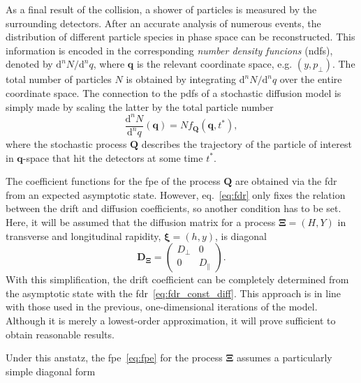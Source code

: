 \documentclass[a4paper,12pt]{book}
\begin{document}
As a final result of the collision, a shower of particles is measured by the surrounding detectors. After an accurate analysis of numerous events, the distribution of different particle species in phase space can be reconstructed. This information is encoded in the corresponding \textit{number density funcions} (\acrshort{ndf}s), denoted by $\mathrm{d}^nN/\mathrm{d}^n q$, where $\bm{q}$ is the relevant coordinate space, e.g. $(y,p_\perp)$. The total number of particles $N$ is obtained by integrating $\mathrm{d}^nN/\mathrm{d}^n q$ over the entire coordinate space. 
The connection to the \acrshort{pdf}s of a stochastic diffusion model is simply made by scaling the latter by the total particle number 
\begin{equation}
\label{eq:ndf_pdf}
   \frac{\mathrm{d}^nN}{\mathrm{d}^n q}(\bm{q}) = N f_{\bm{Q}}(\bm{q},t^*),
\end{equation}
where the stochastic process $\bm{Q}$ describes the trajectory of the particle of interest in $\bm{q}$-space that hit the detectors at some time $t^*$.

The coefficient functions for the \acrshort{fpe} of the process $\bm{Q}$ are obtained via the \acrshort{fdr} from an expected asymptotic state. However, eq.~\eqref{eq:fdr} only fixes the relation between the drift and diffusion coefficients, so another condition has to be set. Here, it will be assumed that the diffusion matrix for a process $\bm{\Xi} =(H,Y)$ in transverse and longitudinal rapidity, $\bm{\xi}=(h,y)$, is diagonal
\begin{equation}
    \bm{D}_{\bm{\Xi}} = \left(\begin{array}{cc}
D_\perp  & 0 \\
0  & D_\parallel
\end{array}\right).
\end{equation}
With this simplification, the drift coefficient can be completely determined from the asymptotic state with the \acrshort{fdr}~\eqref{eq:fdr_const_diff}.
This approach is in line with those used in the previous, one-dimensional iterations of the model. Although it is merely a lowest-order approximation, it will prove sufficient to obtain reasonable results. 

Under this anstatz, the \acrshort{fpe}~\eqref{eq:fpe} for the process $\bm{\Xi}$ assumes a particularly simple diagonal form
\end{document}

